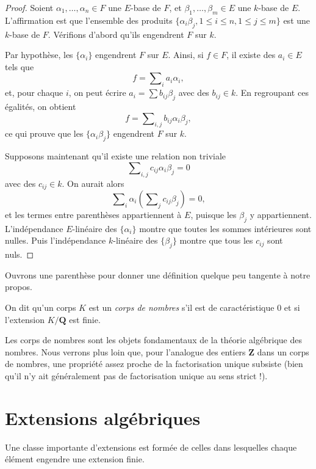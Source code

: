 \begin{proof}
Soient $\alpha_1, \ldots, \alpha_n \in F$ une $E$-base de $F$, et
$\beta_1, \ldots, \beta_m \in E$ une $k$-base de $E$. L'affirmation est
que l'ensemble des produits
$\{\alpha_i \beta_j, 1 \leq i \leq n, 1 \leq j \leq m\}$
est une $k$-base de $F$. Vérifions d'abord qu'ils engendrent $F$ sur $k$.

\medskip\noindent
Par hypothèse, les $\{\alpha_i\}$ engendrent $F$ sur $E$. Ainsi, si
$f \in F$, il existe des $a_i \in E$ tels que
$$
f = \sum\nolimits_i a_i \alpha_i,
$$
et, pour chaque $i$, on peut écrire $a_i = \sum b_{ij} \beta_j$ avec des
$b_{ij} \in k$. En regroupant ces égalités, on obtient
$$
f = \sum\nolimits_{i,j} b_{ij} \alpha_i \beta_j,
$$
ce qui prouve que les $\{\alpha_i \beta_j\}$ engendrent $F$ sur $k$.

\medskip\noindent
Supposons maintenant qu'il existe une relation non triviale
$$
\sum\nolimits_{i,j} c_{ij} \alpha_i \beta_j = 0
$$
avec des $c_{ij} \in k$. On aurait alors
$$
\sum\nolimits_i \alpha_i \left( \sum\nolimits_j c_{ij} \beta_j \right) = 0,
$$
et les termes entre parenthèses appartiennent à $E$, puisque les $\beta_j$ y appartiennent.
L'indépendance $E$-linéaire des $\{\alpha_i\}$ montre que toutes les sommes intérieures sont nulles.
Puis l'indépendance $k$-linéaire des $\{\beta_j\}$ montre que tous les
$c_{ij}$ sont nuls.
\end{proof}

\noindent
Ouvrons une parenthèse pour donner une définition quelque peu tangente à notre propos.

\begin{definition}
\label{definition-number-field}
On dit qu'un corps $K$ est un {\it corps de nombres} s'il est de caractéristique
$0$ et si l'extension $K/\mathbf{Q}$ est finie.
\end{definition}

\noindent
Les corps de nombres sont les objets fondamentaux de la théorie algébrique des nombres. Nous verrons
plus loin que,
pour l'analogue des entiers $\mathbf{Z}$ dans un corps de nombres, une propriété
assez proche de la factorisation unique subsiste (bien qu'il n'y ait généralement
pas de factorisation unique au sens strict !).


\section{Extensions algébriques}
\label{section-algebraic-extensions}

\noindent
Une classe importante d'extensions est formée de celles dans lesquelles chaque élément engendre
une extension finie.


